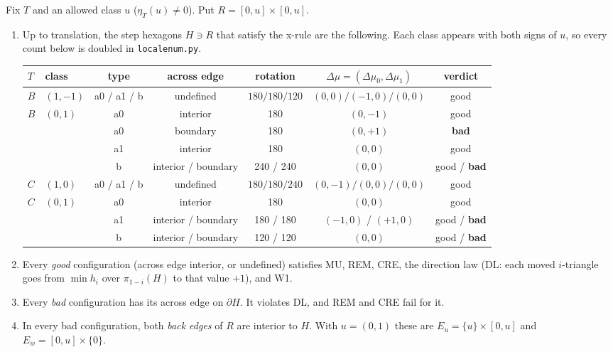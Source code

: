 \documentclass[11pt]{article}
\theoremstyle{definition}\newtheorem{definition}[theorem]{Definition}\newtheorem{remark}[theorem]{Remark}
\begin{document}
\begin{lemma}\label{lem:table}
Fix $T$ and an allowed class $u$ ($\eta_T(u)\ne0$). Put $R=[0,u]\times[0,u]$.
\begin{enumerate}
\item Up to translation, the step hexagons $H\ni R$ that satisfy the x-rule are the following. Each class appears with both signs of $u$, so every count below is doubled in \texttt{localenum.py}.
\begin{center}\begin{tabular}{llccccc}\toprule
$T$ & class & type & across edge & rotation & $\Delta\mu=(\Delta\mu_0,\Delta\mu_1)$ & verdict\\\midrule
$B$ & $(1,-1)$ & a0 / a1 / b & undefined & $180/180/120$ & $(0,0)/(-1,0)/(0,0)$ & good\\
$B$ & $(0,1)$ & a0 & interior & 180 & $(0,-1)$ & good\\
 & & a0 & boundary & 180 & $(0,+1)$ & \textbf{bad}\\
 & & a1 & interior & 180 & $(0,0)$ & good\\
 & & b & interior / boundary & 240 / 240 & $(0,0)$ & good / \textbf{bad}\\
$C$ & $(1,0)$ & a0 / a1 / b & undefined & $180/180/240$ & $(0,-1)/(0,0)/(0,0)$ & good\\
$C$ & $(0,1)$ & a0 & interior & 180 & $(0,0)$ & good\\
 & & a1 & interior / boundary & 180 / 180 & $(-1,0)$ / $(+1,0)$ & good / \textbf{bad}\\
 & & b & interior / boundary & 120 / 120 & $(0,0)$ & good / \textbf{bad}\\\bottomrule
\end{tabular}\end{center}
\item Every \emph{good} configuration (across edge interior, or undefined) satisfies MU, REM, CRE, the direction law (DL: each moved $i$-triangle goes from $\min h_i$ over $\pi_{1-i}(H)$ to that value $+1$), and W1.
\item Every \emph{bad} configuration has its across edge on $\partial H$. It violates DL, and REM and CRE fail for it.
\item In every bad configuration, both \emph{back edges} of $R$ are interior to $H$. With $u=(0,1)$ these are $E_u=\{u\}\times[0,u]$ and $E_w=[0,u]\times\{0\}$.
\end{enumerate}
\end{lemma}
\end{document}
